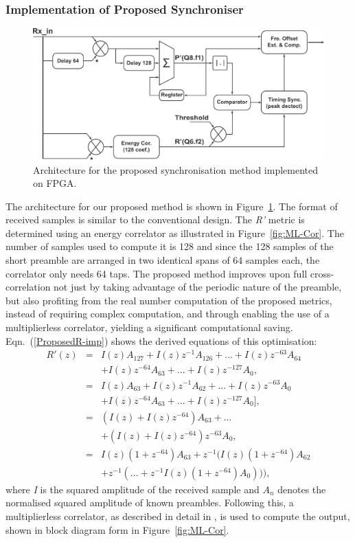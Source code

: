 		\subsubsection{Implementation of Proposed Synchroniser}

\begin{figure}[h]
	\centerline{\includegraphics [width=0.8\columnwidth] {figures/Pro_Sync.pdf}}
	\caption{Architecture for the proposed synchronisation method implemented on FPGA.}
	\label{fig:Pro-Sync}
\end{figure}

The architecture for our proposed method is shown in Figure~\ref{fig:Pro-Sync}.
The format of received samples is similar to the conventional design.
The \emph{R'} metric is determined using an energy correlator as illustrated in Figure~\ref{fig:ML-Cor}.
The number of samples used to compute it is 128 and since the 128 samples of the short preamble are arranged in two identical spans of 64 samples each, the correlator only needs 64 taps.
The proposed method improves upon full cross-correlation not just by taking advantage of the periodic nature of the preamble, but also profiting from the real number computation of the proposed metrics, instead of requiring complex computation, and through enabling the use of a multiplierless correlator, yielding a significant computational saving.
Eqn.~(\ref{ProposedR-imp}) shows the derived equations of this optimisation:
\begin{eqnarray}
\label{ProposedR-imp}
R'(z) &=& I(z)A_{127} + I(z) z^{-1}A_{126} + ... + I(z) z^{-63}A_{64} \nonumber \\
	  &  &	+ I(z) z^{-64}A_{63} + ...+ I(z) z^{-127}A_0, \nonumber \\
	  &=& I(z)A_{63}   + I(z) z^{-1}A_{62}  +...+ I(z) z^{-63}A_0 \nonumber \\
	  &  &	+ I(z) z^{-64}A_{63} + ...+I(z) z^{-127} A_0], \nonumber \\
	  &=& (I(z)+I(z)z^{-64})A_{63} +... \nonumber \\
	  &  & 	+ (I(z)+I(z)z^{-64}) z^{-63}A_0, \nonumber \\
	  &=&I(z) (1+z^{-64})A_{63} +  z^{-1}(I(z)(1+z^{-64})A_{62}\nonumber \\
	  &	&						 + z^{-1 }( ...+z^{-1}I(z)(1+z^{-64})A_{0}))),
\end{eqnarray}
where \emph{I} is the squared amplitude of the received sample and $A_n$ denotes the normalised squared amplitude of known preambles.
Following this, a multiplierless correlator, as described in detail in \cite{Pham2012}, is used to compute the output, shown in block diagram form in Figure~\ref{fig:ML-Cor}.

